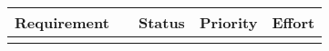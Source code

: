 \documentclass[11pt]{article}
\begin{document}
\begin{longtable}{|l|l|l|c|l|}

\hline
\bf Requirement & & \bf Status & \bf Priority & \bf Effort \\
\hline
\endhead
\hline
\endfoot


\end{longtable}
\end{document}
